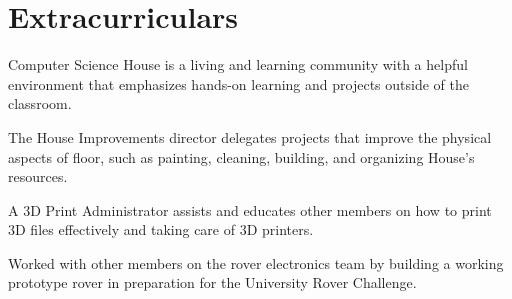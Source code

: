 \documentclass[a4paper]{comcv}
\begin{document}

\section{Extracurriculars}

\vspace{\topsep}
\begin{tightlist}
    \item Computer Science House is a living and learning community with a helpful environment that emphasizes hands-on learning and projects outside of the classroom.

    \item The House Improvements director delegates projects that improve the physical aspects of floor, such as painting, cleaning, building, and organizing House's resources.

	\item A 3D Print Administrator assists and educates other members on how to print 3D files effectively and taking care of 3D printers.
	
\end{tightlist}


\vspace{\topsep}
\begin{tightlist}
    \item Worked with other members on the rover electronics team by building a working prototype rover in preparation for the University Rover Challenge. 

\end{tightlist}
\end{document}
